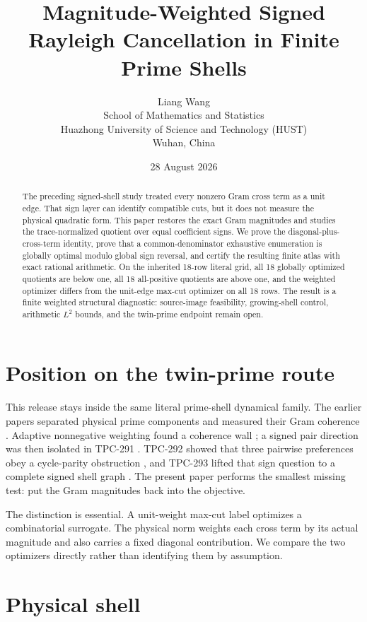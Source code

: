 \documentclass[10pt]{article}
\title{Magnitude-Weighted Signed Rayleigh Cancellation in Finite Prime Shells}
\author{Liang Wang\\
School of Mathematics and Statistics\\
Huazhong University of Science and Technology (HUST)\\
Wuhan, China}
\date{28 August 2026}
\begin{document}
\maketitle

\begin{abstract}
The preceding signed-shell study treated every nonzero Gram cross term as a
unit edge.  That sign layer can identify compatible cuts, but it does not
measure the physical quadratic form.  This paper restores the exact Gram
magnitudes and studies the trace-normalized quotient over equal coefficient
signs.  We prove the diagonal-plus-cross-term identity, prove that a
common-denominator exhaustive enumeration is globally optimal modulo global
sign reversal, and certify the resulting finite atlas with exact rational
arithmetic.  On the inherited 18-row literal grid, all 18 globally optimized
quotients are below one, all 18 all-positive quotients are above one, and the
weighted optimizer differs from the unit-edge max-cut optimizer on all 18
rows.  The result is a finite weighted structural diagnostic: source-image
feasibility, growing-shell control, arithmetic $L^2$ bounds, and the
twin-prime endpoint remain open.
\end{abstract}

\section{Position on the twin-prime route}

This release stays inside the same literal prime-shell dynamical family.  The
earlier papers separated physical prime components and measured their Gram
coherence \cite{tpc287,tpc288,tpc289}.  Adaptive nonnegative weighting found a
coherence wall \cite{tpc290}; a signed pair direction was then isolated in
TPC-291 \cite{tpc291}.  TPC-292 showed that three pairwise preferences obey a
cycle-parity obstruction \cite{tpc292}, and TPC-293 lifted that sign question
to a complete signed shell graph \cite{tpc293}.  The present paper performs
the smallest missing test: put the Gram magnitudes back into the objective.

The distinction is essential.  A unit-weight max-cut label optimizes a
combinatorial surrogate.  The physical norm weights each cross term by its
actual magnitude and also carries a fixed diagonal contribution.  We compare
the two optimizers directly rather than identifying them by assumption.

\section{Physical shell}
\end{document}
